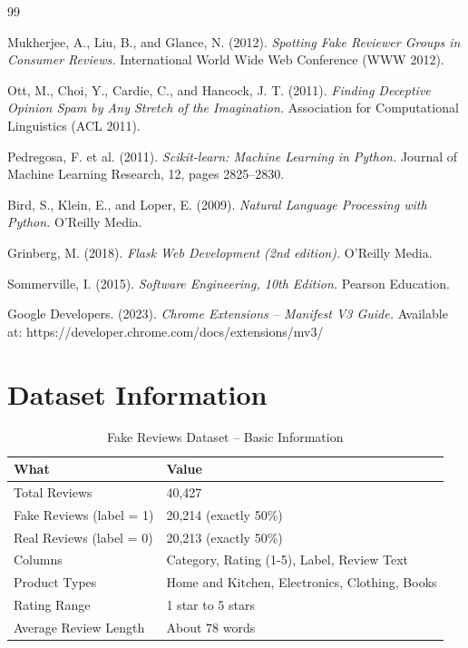 \documentclass[10pt, a4paper]{report}
\begin{document}
\newpage
\begin{thebibliography}{99}

Mukherjee, A., Liu, B., and Glance, N. (2012).
\textit{Spotting Fake Reviewer Groups in Consumer Reviews.}
International World Wide Web Conference (WWW 2012).

Ott, M., Choi, Y., Cardie, C., and Hancock, J. T. (2011).
\textit{Finding Deceptive Opinion Spam by Any Stretch of the Imagination.}
Association for Computational Linguistics (ACL 2011).

Pedregosa, F. et al. (2011).
\textit{Scikit-learn: Machine Learning in Python.}
Journal of Machine Learning Research, 12, pages 2825--2830.

Bird, S., Klein, E., and Loper, E. (2009).
\textit{Natural Language Processing with Python.}
O'Reilly Media.

Grinberg, M. (2018).
\textit{Flask Web Development (2nd edition).}
O'Reilly Media.

Sommerville, I. (2015).
\textit{Software Engineering, 10th Edition.}
Pearson Education.

Google Developers. (2023).
\textit{Chrome Extensions -- Manifest V3 Guide.}
Available at: https://developer.chrome.com/docs/extensions/mv3/

\end{thebibliography}

\appendix
\chapter{Dataset Information}

\begin{table}[H]
\centering
\caption{Fake Reviews Dataset -- Basic Information}
\begin{tabular}{ll}
\toprule
\textbf{What} & \textbf{Value} \\
\midrule
Total Reviews & 40,427 \\
Fake Reviews (label = 1) & 20,214 (exactly 50\%) \\
Real Reviews (label = 0) & 20,213 (exactly 50\%) \\
Columns & Category, Rating (1-5), Label, Review Text \\
Product Types & Home and Kitchen, Electronics, Clothing, Books \\
Rating Range & 1 star to 5 stars \\
Average Review Length & About 78 words \\
\bottomrule
\end{tabular}
\end{table}
\end{document}
